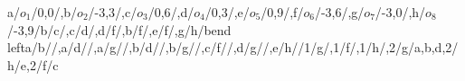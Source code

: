 \begin{compatibilitygraph}{a/$o_1$/{0,0}/,b/$o_2$/{-3,3}/,c/$o_3$/{0,6}/,d/$o_4$/{0,3}/,e/$o_5$/{0,9}/,f/$o_6$/{-3,6}/,g/$o_7$/{-3,0}/,h/$o_8$/{-3,9}/}{b/c/,c/d/,d/f/,b/f/,e/f/,g/h/bend left}{a/b//,a/d//,a/g//,b/d//,b/g//,c/f//,d/g//,e/h//}{}{}{1/g/,1/f/,1/h/,2/g/{a,b,d},2/h/{e},2/f/{c}}
\end{compatibilitygraph}